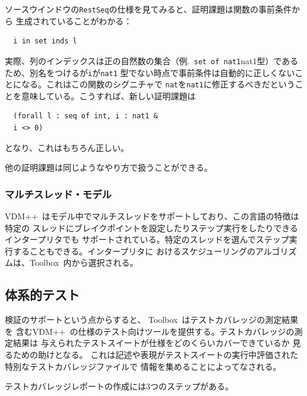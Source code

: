 \documentclass[\pformat,12pt]{jarticle}
\newcommand{\vdmslpp}{VDM++}
\newcommand{\Toolbox}{Toolbox}
\newcommand{\aaa}{\tt }
\newcommand{\guicmd}[1]{{\gt #1}}
\begin{document}
\guicmd{ソースウインドウ}の{\aaa RestSeq}の仕様を見てみると、証明課題は関数の事前条件から
生成されていることがわかる：

\begin{verbatim}
  i in set inds l
\end{verbatim}

実際、列のインデックスは正の自然数の集合（例.\ \verb+set of nat1+nat1型）であるため、別名をつけるが{\aaa i}が{\aaa nat1}
型でない時点で事前条件は自動的に正しくないことになる。これはこの関数のシグニチャで
{\aaa nat}を{\aaa nat1}に修正するべきだということを意味している。こうすれば、新しい証明課題は


\begin{verbatim}
  (forall l : seq of int, i : nat1 &
  i <> 0)
\end{verbatim}

となり、これはもちろん正しい。

他の証明課題は同じようなやり方で扱うことができる。

\subsubsection{マルチスレッド・モデル}


\vdmslpp\ はモデル中でマルチスレッドをサポートしており、この言語の特徴は特定の
スレッドにブレイクポイントを設定したりステップ実行をしたりできるインタープリタでも
サポートされている。特定のスレッドを選んでステップ実行することもできる。インタープリタに
おけるスケジューリングのアルゴリズムは、\Toolbox\ 内から選択される。


\subsection{体系的テスト}
\label{tour:testing}


検証のサポートという点からすると、 \Toolbox\ はテストカバレッジの測定結果を
含む\vdmslpp\ の仕様のテスト向けツールを提供する。テストカバレッジの測定結果は
与えられたテストスイートが仕様をどのくらいカバーできているか
見るための助けとなる。
これは記述や表現がテストスイートの実行中評価された特別なテストカバレッジファイルで
情報を集めることによってなされる。

テストカバレッジレポートの作成には3つのステップがある。
\end{document}

